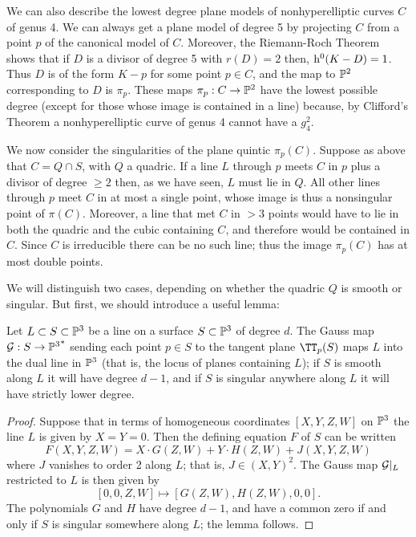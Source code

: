 We can also describe the lowest degree plane models of nonhyperelliptic curves $C$ of genus 4. 
We can always get a plane model of degree 5 by projecting $C$ from a point $p$ of the canonical model of $C$. Moreover, the Riemann-Roch Theorem shows that if $D$ is a divisor of degree 5 with $r(D)=2$ then,  $\h^0(K-D) = 1$. Thus $D$ is of the form $K-p$ for some point $p \in C$, and the map to $\PP^2$ corresponding to $D$ is $\pi_p$. These  maps $\pi_p: C\to \PP^2$ have the lowest possible degree (except for those whose image is  contained in a line) because, by Clifford's Theorem a nonhyperelliptic curve of genus 4 cannot have a $g^2_4$.

We now consider the singularities of the plane quintic $\pi_p(C)$. Suppose as above that $C = Q\cap S$, with $Q$ a quadric. If a line $L$ through $p$ meets $C$ in $p$ plus a divisor of degree $\geq 2$ then, as we have seen, $L$ must lie in $Q$.  All other lines through $p$ meet $C$ in at most a single point,  whose image is thus a nonsingular point of $\pi(C)$. Moreover, a line that met $C$ in $>3$ points would have to lie in both the quadric and the cubic containing $C$, and therefore would be contained in $C$. Since $C$ is irreducible there can be no such line; thus the image $\pi_p(C)$ has at most double points.

We will distinguish two cases, depending on whether the quadric $Q$ is smooth or singular. But first, we should introduce a useful lemma:

\begin{lemma}
Let $L \subset S \subset \PP^3$ be a line on a surface $S \subset \PP^3$ of degree $d$. The Gauss map $\cG : S \to {\PP^3}^*$ sending each point $p \in S$ to the tangent plane $\TT_p(S)$ maps $L$ into the dual line in $\PP^3$ (that is, the locus of planes containing $L$); if $S$ is smooth along $L$ it will have degree $d-1$, and if $S$ is singular anywhere along $L$ it will have strictly lower degree.
\end{lemma}

\begin{proof}
Suppose that in terms of homogeneous coordinates $[X,Y,Z,W]$ on $\PP^3$ the line $L$ is given by $X = Y = 0$. Then the defining equation $F$ of $S$ can be written
$$
F(X,Y,Z,W) = X\cdot G(Z,W) + Y\cdot H(Z,W) + J(X,Y,Z,W)
$$
where $J$ vanishes to order 2 along $L$; that is, $J \in (X,Y)^2$. The Gauss map $\cG|_L$ restricted to $L$ is then given by
$$
[0,0,Z,W] \mapsto [G(Z,W), H(Z,W), 0, 0].
$$
The polynomials $G$ and $H$ have degree $d-1$, and have a common zero if and only if $S$ is singular somewhere along $L$; the lemma follows.
\end{proof}

